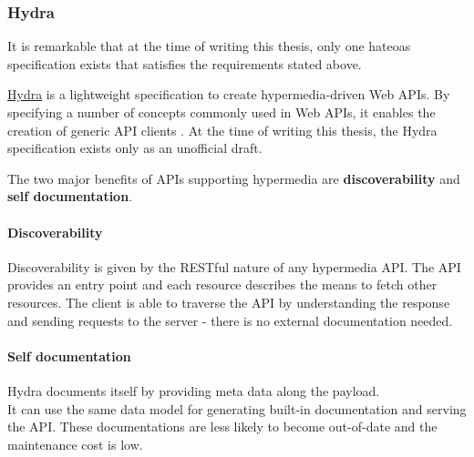 \subsubsection{Hydra}
It is remarkable that at the time of writing this thesis, only one \gls{hateoas} specification exists that satisfies the requirements stated above.

\href{http://www.hydra-cg.com/}{Hydra} is a lightweight specification to create hypermedia-driven Web APIs. By specifying a number of concepts commonly used in Web APIs, it enables the creation of generic API clients \citep{hydraspecs}. At the time of writing this thesis, the Hydra specification exists only as an unofficial draft.

The two major benefits of APIs supporting hypermedia are \textbf{discoverability} and \textbf{self documentation}.

\paragraph{Discoverability} Discoverability is given by the RESTful nature of any hypermedia API. The API provides an entry point and each resource describes the means to fetch other resources. The client is able to traverse the API by understanding the response and sending requests to the server - there is no external documentation needed.

\paragraph{Self documentation}
Hydra documents itself by providing meta data along the payload. \\
It can use the same data model for generating built-in documentation and serving the API. These documentations are less likely to become out-of-date and the maintenance cost is low.

